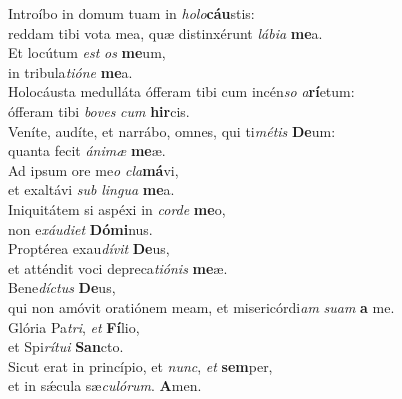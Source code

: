 \evenverse Introíbo in domum tuam in \textit{ho}\textit{lo}\textbf{cáu}stis:~\*\\
\evenverse reddam tibi vota mea, quæ distinxérunt \textit{lá}\textit{bi}\textit{a} \textbf{me}a.\\
\oddverse Et locútum \textit{est} \textit{os} \textbf{me}um,~\*\\
\oddverse in tribula\textit{ti}\textit{ó}\textit{ne} \textbf{me}a.\\
\evenverse Holocáusta medulláta ófferam tibi cum incén\textit{so} \textit{a}\textbf{rí}etum:~\*\\
\evenverse ófferam tibi \textit{bo}\textit{ves} \textit{cum} \textbf{hir}cis.\\
\oddverse Veníte, audíte, et narrábo, omnes, qui ti\textit{mé}\textit{tis} \textbf{De}um:~\*\\
\oddverse quanta fecit \textit{á}\textit{ni}\textit{mæ} \textbf{me}æ.\\
\evenverse Ad ipsum ore me\textit{o} \textit{cla}\textbf{má}vi,~\*\\
\evenverse et exaltávi \textit{sub} \textit{lin}\textit{gua} \textbf{me}a.\\
\oddverse Iniquitátem si aspéxi in \textit{cor}\textit{de} \textbf{me}o,~\*\\
\oddverse non e\textit{xáu}\textit{di}\textit{et} \textbf{Dó}\textbf{mi}nus.\\
\evenverse Proptérea exau\textit{dí}\textit{vit} \textbf{De}us,~\*\\
\evenverse et atténdit voci depreca\textit{ti}\textit{ó}\textit{nis} \textbf{me}æ.\\
\oddverse Bene\textit{dí}\textit{ctus} \textbf{De}us,~\*\\
\oddverse qui non amóvit oratiónem meam, et misericórdi\textit{am} \textit{su}\textit{am} \textbf{a} me.\\
\evenverse Glória Pa\textit{tri}, \textit{et} \textbf{Fí}lio,~\*\\
\evenverse et Spi\textit{rí}\textit{tu}\textit{i} \textbf{San}cto.\\
\oddverse Sicut erat in princípio, et \textit{nunc}, \textit{et} \textbf{sem}per,~\*\\
\oddverse et in sǽcula sæ\textit{cu}\textit{ló}\textit{rum}. \textbf{A}men.\\
